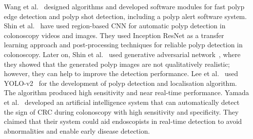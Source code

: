 \documentclass[journal]{IEEEtran}
\begin{document}
Wang et al.~\cite{wang2015polyp} designed algorithms and developed software modules for fast polyp edge detection and polyp shot detection, including a polyp alert software system. Shin et al.~\cite{shin2018automatic} have used region-based \ac{CNN} for automatic polyp detection in colonoscopy videos and images. They used Inception ResNet as a transfer learning approach and post-processing techniques for reliable polyp detection in colonoscopy. Later on, Shin et al.~\cite{shin2018abnormal} used generative adversarial network~\cite{goodfellow2014generative}, where they showed that the generated polyp images are not qualitatively realistic; however, they can help to improve the detection performance. Lee et al.~\cite{lee2020real} used YOLO-v2~\cite{redmon2016you,redmon2017yolo9000} for the development of polyp detection and localisation algorithm. The algorithm produced high sensitivity and near real-time performance. Yamada et al.~\cite{yamada2019development} developed an artificial intelligence system that can automatically detect the sign of \ac{CRC} during colonoscopy with high sensitivity and specificity. They claimed that their system could aid endoscopists in real-time detection to avoid abnormalities and enable early disease detection. 
\end{document}
